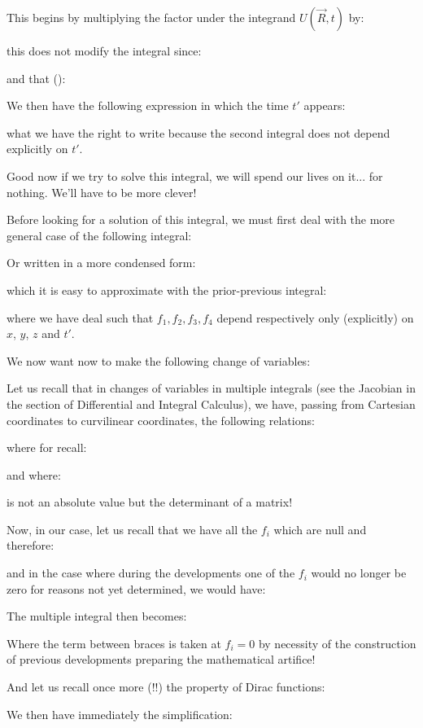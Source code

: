 	This begins by multiplying the factor under the integrand $U(\vec{R},t)$ by:
	
	this does not modify the integral since:
	
	and that ():
	
	We then have the following expression in which the time $t'$ appears:
	
	what we have the right to write because the second integral does not depend explicitly on $t'$.
	
	Good now if we try to solve this integral, we will spend our lives on it... for nothing. We'll have to be more clever!

	Before looking for a solution of this integral, we must first deal with the more general case of the following integral:
	
	Or written in a more condensed form:
	
	which it is easy to approximate with the prior-previous integral:
	
	where we have deal such that $f_1,f_2,f_3,f_4$ depend respectively only (explicitly) on $x$, $y$, $z$ and $t'$.

	We now want now to make the following change of variables:
	
	Let us recall that in changes of variables in multiple integrals (see the Jacobian in the section of Differential and Integral Calculus), we have, passing from Cartesian coordinates to curvilinear coordinates, the following relations:
	
	where for recall:
	
	and where:
	
	is not an absolute value but the determinant of a matrix!
	
	Now, in our case, let us recall that we have all the $f_i$ which are null and therefore:
	
	and in the case where during the developments one of the $f_i$ would no longer be zero for reasons not yet determined, we would have:
	
	The multiple integral then becomes:
	
	Where the term between braces is taken at $f_i=0$ by necessity of the construction of previous developments preparing the mathematical artifice!

	And let us recall once more (!!) the property of Dirac functions:
	
 	We then have immediately the simplification:
	
